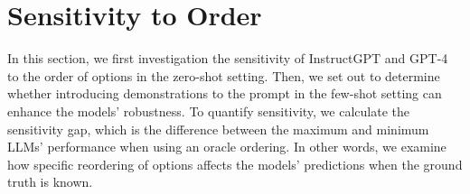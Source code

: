 \documentclass[11pt]{article}
\begin{document}
\section{Sensitivity to Order}
In this section, we first investigation the sensitivity of InstructGPT and GPT-4 to the order of options in the zero-shot setting. 
Then, we set out to determine whether introducing demonstrations to the prompt in the few-shot setting can enhance the models' robustness.
To quantify sensitivity, we calculate the sensitivity gap, which is the difference between the maximum and minimum LLMs' performance when using an oracle ordering. In other words, we examine how specific reordering of options affects the models' predictions when the ground truth is known. 

\end{document}
